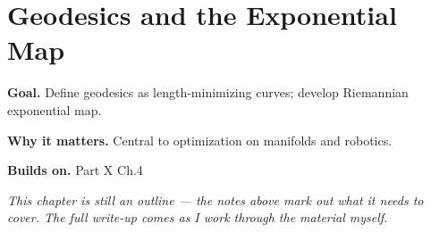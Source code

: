 \chapter{Geodesics and the Exponential Map}
\label{ch:10-differential-geometry-05}

\begin{chapterintro}
\textbf{Goal.} Define geodesics as length-minimizing curves; develop Riemannian exponential map.

\textbf{Why it matters.} Central to optimization on manifolds and robotics.

\textbf{Builds on.} Part X Ch.4
\end{chapterintro}

\textit{This chapter is still an outline --- the notes above mark out what it needs to cover. The full write-up comes as I work through the material myself.}

